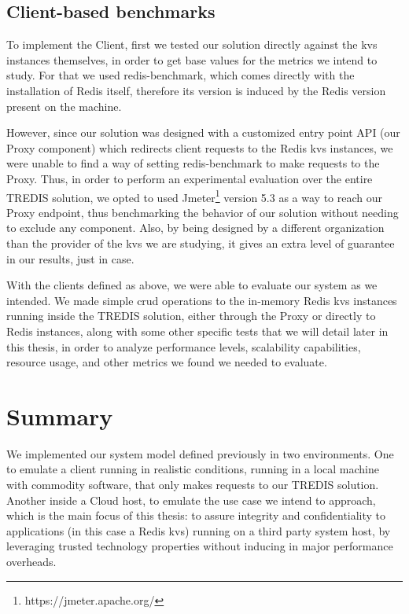 \subsection{Client-based benchmarks}

To implement the Client, first we tested our solution directly against the \gls{kvs} instances themselves, in order to get base values for the metrics we intend to study. For that we used redis-benchmark, which comes directly with the installation of Redis itself, therefore its version is induced by the Redis version present on the machine.

However, since our solution was designed with a customized entry point API (our Proxy component) which redirects client requests to the Redis \gls{kvs} instances, we were unable to find a way of setting redis-benchmark to make requests to the Proxy. 
Thus, in order to perform an experimental evaluation over the entire TREDIS solution, we opted to used Jmeter\footnote{https://jmeter.apache.org/} version 5.3 as a way to reach our Proxy endpoint, thus benchmarking the behavior of our solution without needing to exclude any component. Also, by being designed by a different organization than the provider of the \gls{kvs} we are studying, it gives an extra level of guarantee in our results, just in case.

With the clients defined as above, we were able to evaluate our system as we intended. 
We made simple \gls{crud} operations to the in-memory Redis \gls{kvs} instances running inside the TREDIS solution, either through the Proxy or directly to Redis instances, along with some other specific tests that we will detail later in this thesis, in order to analyze performance levels, scalability capabilities, resource usage, and other metrics we found we needed to evaluate.



\section{Summary}
\label{sec:implementationSummary}

We implemented our system model defined previously in two environments. 
One to emulate a client running in realistic conditions, running in a local machine with commodity software, that only makes requests to our TREDIS solution. Another inside a Cloud host, to emulate the use case we intend to approach, which is the main focus of this thesis: to assure integrity and confidentiality to applications (in this case a Redis \gls{kvs}) running on a third party system host, by leveraging trusted technology properties without inducing in major performance overheads.

